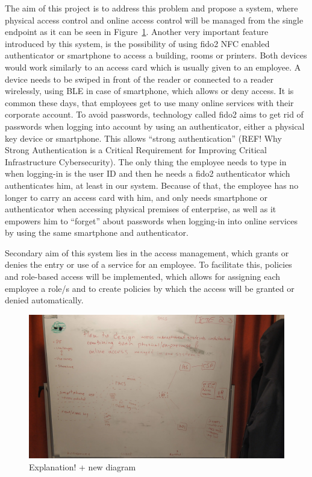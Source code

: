 The aim of this project is to address this problem and propose a system, where physical access control and online access control will be managed from the single endpoint as it can be seen in Figure~\ref{fig:IntroArchitecture}. Another very important feature introduced by this system, is the possibility of using \acrshort{fido}2 \acrshort{NFC} enabled authenticator or smartphone to access a building, rooms or printers. Both devices would work similarly to an access card which is usually given to an employee. A device needs to be swiped in front of the reader or connected to a reader wirelessly, using \acrshort{BLE} in case of smartphone, which allows or deny access. It is common these days, that employees get to use many online services with their corporate account. To avoid passwords, technology called \acrshort{fido}2 aims to get rid of passwords when logging into account by using an authenticator, either a physical key device or smartphone. This allows “strong authentication” (REF! Why Strong Authentication is a Critical Requirement for Improving Critical Infrastructure Cybersecurity). The only thing the employee needs to type in when logging-in is the user ID and then he needs a \acrshort{fido}2 authenticator which authenticates him, at least in our system. Because of that, the employee has no longer to carry an access card with him, and only needs smartphone or authenticator when accessing physical premises of enterprise, as well as it empowers him to “forget” about passwords when logging-in into online services by using the same smartphone and authenticator.

Secondary aim of this system lies in the access management, which grants or denies the entry or use of a service for an employee. To facilitate this, policies and role-based access will be implemented, which allows for assigning each employee a role/s and to create policies by which the access will be granted or denied automatically.

\begin{figure}[ht]
    \centering
    \includegraphics[width=.95\textwidth]{00images/IntroArchitecture}
    \caption{Explanation! + new diagram}
    \label{fig:IntroArchitecture}
\end{figure}

